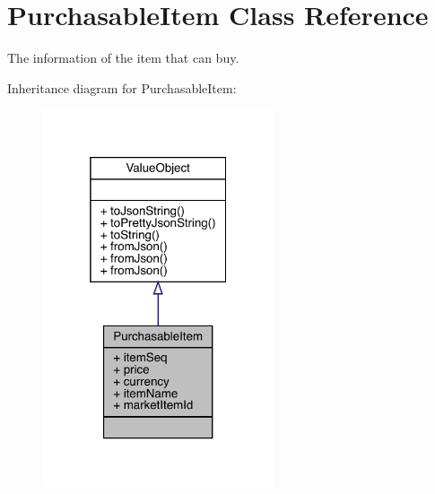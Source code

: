 \hypertarget{classcom_1_1toast_1_1android_1_1gamebase_1_1base_1_1purchase_1_1_purchasable_item}{}\section{Purchasable\+Item Class Reference}
\label{classcom_1_1toast_1_1android_1_1gamebase_1_1base_1_1purchase_1_1_purchasable_item}


The information of the item that can buy.  




Inheritance diagram for Purchasable\+Item\+:\nopagebreak
\begin{figure}[H]
\begin{center}
\leavevmode
\includegraphics[width=193pt]{classcom_1_1toast_1_1android_1_1gamebase_1_1base_1_1purchase_1_1_purchasable_item__inherit__graph}
\end{center}
\end{figure}


